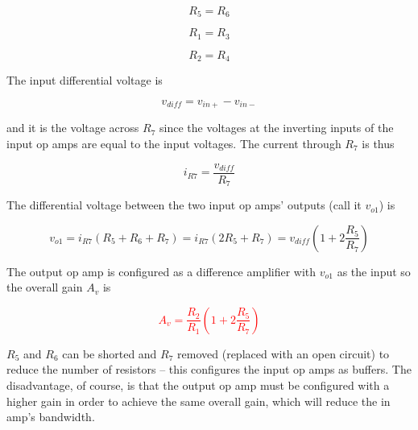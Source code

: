 \begin{equation}
R_{5} = R_{6}
\end{equation}

\begin{equation}
R_{1} = R_{3}
\end{equation}

\begin{equation}
R_{2} = R_{4}
\end{equation}

\noindent The input differential voltage is

\begin{equation}
v_{diff} = v_{in+}-v_{in-}
\end{equation}

\noindent and it is the voltage across $R_{7}$ since the voltages at the inverting inputs of the input op amps are equal to the input voltages. The current through $R_{7}$ is thus

\begin{equation}
i_{R7} = \frac{v_{diff}}{R_{7}}
\end{equation}

The differential voltage between the two input op amps' outputs (call it $v_{o1}$) is

\begin{equation}
v_{o1} = i_{R7}(R_{5}+R_{6}+R_{7}) = i_{R7}(2R_{5}+R_{7}) = v_{diff}(1+2\frac{R_{5}}{R_{7}})
\end{equation}

The output op amp is configured as a difference amplifier with $v_{o1}$ as the input so the overall gain $A_{v}$ is

\textcolor{red}{
\begin{equation}
A_{v} = \frac{R_{2}}{R_{1}}(1+2\frac{R_{5}}{R_{7}})
\label{eq:threeinamp}
\end{equation}
}

$R_{5}$ and $R_{6}$ can be shorted and $R_{7}$ removed (replaced with an open circuit) to reduce the number of resistors -- this configures the input op amps as buffers. The disadvantage, of course, is that the output op amp must be configured with a higher gain in order to achieve the same overall gain, which will reduce the in amp's bandwidth.

